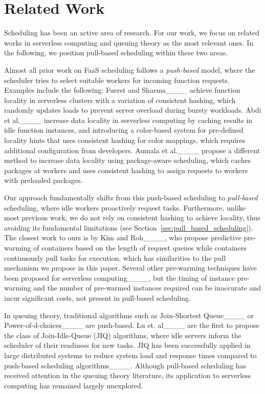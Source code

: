 \section{Related Work}
\label{sec:related_work}



Scheduling has been an active area of research. For our work, we focus on related works in serverless computing and queuing theory as the most relevant ones. In the following, we position pull-based scheduling within these two areas.

Almost all prior work on FaaS scheduling follows a \textit{push-based} model, where the scheduler tries to select suitable workers for incoming function requests. Examples include the following:
Fuerst and Sharma____ achieve function locality in serverless clusters with a variation of consistent hashing, which randomly updates loads to prevent server overload during bursty workloads.
Abdi et al.____ increase data locality in serverless computing by caching results in idle function instances, and introducing a color-based system for pre-defined locality hints that uses consistent hashing for color mappings, which requires additional configuration from developers.
Aumala et al.____ propose a different method to increase data locality using package-aware scheduling, which caches packages at workers and uses consistent hashing to assign requests to workers with preloaded packages.

Our approach fundamentally shifts from this push-based scheduling to \textit{pull-based} scheduling, where idle workers proactively request tasks. Furthermore, unlike most previous work, we do not rely on consistent hashing to achieve locality, thus avoiding its fundamental limitations (see Section~\ref{sec:pull_based_scheduling}).
The closest work to ours is by Kim and Roh____, who propose predictive pre-warming of containers based on the length of request queues while containers continuously pull tasks for execution, which has similarities to the pull mechanism we propose in this paper. Several other pre-warming techniques have been proposed for serverless computing____, but the timing of instance pre-warming and the number of pre-warmed instances required can be inaccurate and incur significant costs, not present in pull-based scheduling.


In queuing theory, traditional algorithms such as Join-Shortest Queue____ or Power-of-d-choices____ are push-based.
Lu et. al____ are the first to propose the class of Join-Idle-Queue (JIQ) algorithms, where idle servers inform the scheduler of their readiness for new tasks. JIQ has been successfully applied in large distributed systems to reduce system load and response times compared to push-based scheduling algorithms____. Although pull-based scheduling has received attention in the queuing theory literature, its application to serverless computing has remained largely unexplored.
